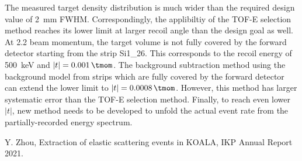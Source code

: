 \documentclass[fleqn,twocolumn,a4paper]{ikpar}
\begin{document}
\par
\medskip

The measured target density distribution is much wider than the required design value
of \SI{2}{\mm} FWHM.
Correspondingly, the applibiltiy of the TOF-E selection method reaches its lower
limit at larger recoil angle than the design goal as well.
At \SI{2.2}{\momentum} beam momentum, the target volume is not fully covered by
the forward detector starting from the strip Si1\_26.
This corresponds to the recoil energy of \SI{500}{\keV} and $|t| = \SI{0.001}{\tmom}$.
The background subtraction method using the background model from strips which
are fully covered by the forward detector can extend the lower limit to $|t| = \SI{0.0008}{\tmom}$.
However, this method has larger systematic error than the TOF-E selection method.
Finally, to reach even lower $|t|$, new method needs to be developed to unfold the
actual event rate from the partially-recorded energy spectrum.

\par
\medskip

\begin{thebibliography}{99}
 Y. Zhou, Extraction of elastic scattering events in KOALA, IKP Annual Report 2021.
\end{thebibliography}
\end{document}
